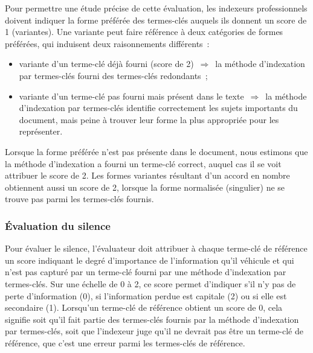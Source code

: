         Pour permettre une étude précise de cette évaluation, les indexeurs
        professionnels doivent indiquer la forme préférée des termes-clés
        auquels ils donnent un score de 1 (variantes). Une variante peut faire
        référence à deux catégories de formes préférées, qui induisent deux
        raisonnements différents~:
        \begin{itemize}
          \item{variante d'un terme-clé déjà fourni (score de
                2)~$\Rightarrow$~la méthode d'indexation par termes-clés fourni
                des termes-clés redondants~;}
          \item{variante d'un terme-clé pas fourni mais présent dans le
              texte~$\Rightarrow$~la méthode d'indexation par termes-clés
                identifie correctement les sujets importants du document, mais
                peine à trouver leur forme la plus appropriée pour les
                représenter.}
        \end{itemize}

        Lorsque la forme préférée n'est pas présente dans le document, nous
        estimons que la méthode d'indexation a fourni un terme-clé correct,
        auquel cas il se voit attribuer le score de 2. Les formes variantes
        résultant d'un accord en nombre obtiennent aussi un score de 2, lorsque
        la forme normalisée (singulier) ne se trouve pas parmi les termes-clés
        fournis.



      \subsubsection{Évaluation du silence}
      \label{subsubsec:main-automatic_evaluation_of_keyphrase_annotation-methodology-evaluation_protocol-silence}
        Pour évaluer le silence, l'évaluateur doit attribuer à chaque terme-clé
        de référence un score indiquant le degré d'importance de l'information
        qu'il véhicule et qui n'est pas capturé par un terme-clé fourni par une
        méthode d'indexation par termes-clés. Sur une échelle de 0 à 2, ce score
        permet d'indiquer s'il n'y pas de perte d'information (0), si
        l'information perdue est capitale (2) ou si elle est secondaire (1).
        Lorsqu'un terme-clé de référence obtient un score de 0, cela signifie
        soit qu'il fait partie des termes-clés fournis par la méthode
        d'indexation par termes-clés, soit que l'indexeur juge qu'il ne devrait
        pas être un terme-clé de référence, que c'est une erreur parmi les
        termes-clés de référence.

